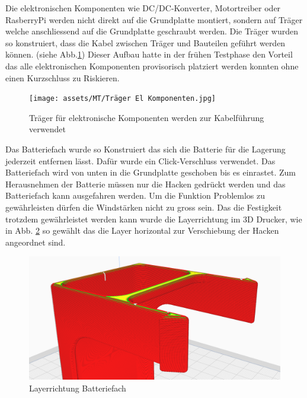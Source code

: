 Die elektronischen Komponenten wie DC/DC-Konverter, Motortreiber oder RasberryPi werden nicht direkt auf die Grundplatte montiert, sondern auf Träger welche anschliessend auf die Grundplatte geschraubt werden. Die Träger wurden so konstruiert, dass die Kabel zwischen Träger und Bauteilen geführt werden können. (siehe Abb.\ref{fig: Träger für elektronische Komponenten}) Dieser Aufbau hatte in der frühen Testphase den Vorteil das alle elektronischen Komponenten provisorisch platziert werden konnten ohne einen Kurzschluss zu Riskieren. 



\begin{figure}[H]
\centering
\texttt{[image: assets/MT/Träger El Komponenten.jpg]}
\caption{Träger für elektronische Komponenten werden zur Kabelführung verwendet}
\label{fig: Träger für elektronische Komponenten}
\end{figure}

Das Batteriefach wurde so Konstruiert das sich die Batterie für die Lagerung jederzeit entfernen lässt. Dafür wurde ein Click-Verschluss verwendet. Das Batteriefach wird von unten in die Grundplatte geschoben bis es einrastet. Zum Herausnehmen der Batterie müssen nur die Hacken gedrückt werden und das Batteriefach kann ausgefahren werden. Um die Funktion Problemlos zu gewährleisten dürfen die Windstärken nicht zu gross sein. Das die Festigkeit trotzdem gewährleistet werden kann wurde die Layerrichtung im 3D Drucker, wie in Abb. \ref{Layerrichtung Batteriefach} so gewählt das die Layer horizontal zur Verschiebung der Hacken angeordnet sind. 


\begin{figure}[H]
\centering
\includegraphics[width=\textwidth]{assets/MT/Layer_Batterie Fach.png}
\caption{Layerrichtung Batteriefach}
\label{Layerrichtung Batteriefach}
\end{figure}

